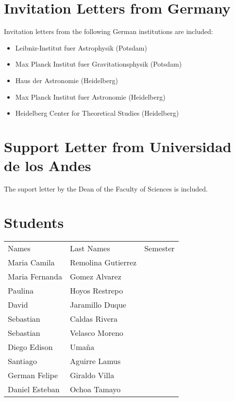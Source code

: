 \documentclass[12pt]{article}
\begin{document}
\section{Invitation Letters from Germany}
Invitation letters from the following German institutions are included:

\begin{itemize}
\item Leibniz-Institut fuer Astrophysik (Potsdam)
\item Max Planck Institut fuer Gravitationsphysik (Potsdam)
\item Haus der Astronomie (Heidelberg)
\item Max Planck Institut fuer Astronomie (Heidelberg)
\item Heidelberg Center for Theoretical Studies (Heidelberg)
\end{itemize}

\section{Support Letter from Universidad de los Andes}
The suport letter by the Dean of the Faculty of Sciences is included.

\section{Students}

\begin{tabular}{lll}
Names & Last Names & Semester \\
Maria Camila & Remolina Gutierrez & \\
Maria Fernanda & Gomez Alvarez & \\ 
Paulina & Hoyos Restrepo& \\
David & Jaramillo Duque & \\
Sebastian & Caldas Rivera & \\
Sebastian & Velasco Moreno & \\
Diego Edison & Uma\~na & \\
Santiago & Aguirre Lamus & \\
German Felipe & Giraldo Villa & \\
Daniel Esteban & Ochoa Tamayo & \\
\end{tabular}
\end{document}
